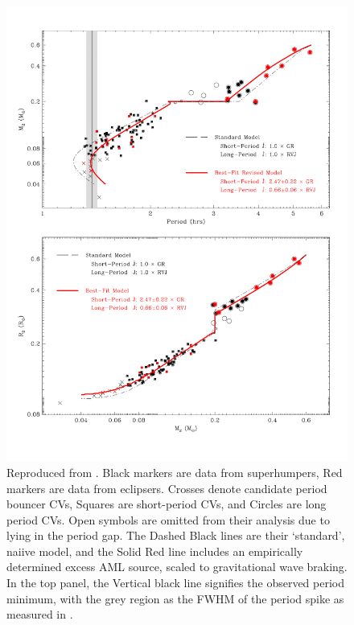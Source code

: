 \begin{figure}
    \centering
    \includegraphics[width=\textwidth, trim={0 2cm 0 2cm}]{figures/introduction/Knigge11_fig9.pdf}
    \caption{Reproduced from \citet{knigge11}. {Black} markers are data from superhumpers, {Red} markers are data from eclipsers. {Crosses} denote candidate period bouncer CVs, {Squares} are short-period CVs, and {Circles} are long period CVs. {Open symbols} are omitted from their analysis due to lying in the period gap. The {Dashed Black lines} are their `standard', naiive model, and the {Solid Red line} includes an empirically determined excess AML source, scaled to gravitational wave braking. In the top panel, the {Vertical black line} signifies the observed period minimum, with the grey region as the FWHM of the period spike as measured in \citet{gaensicke2009}.}
    \label{fig:introduction:Knigge 2011 figure 9}
\end{figure}

